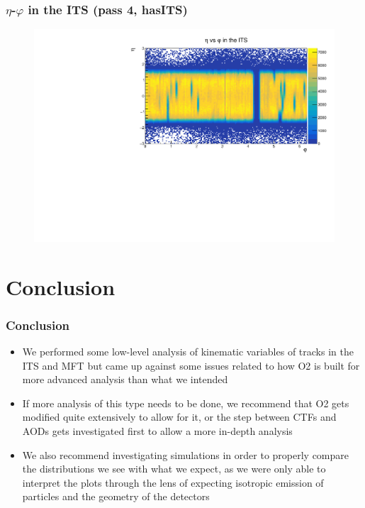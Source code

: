 \documentclass[10pt]{beamer}
\begin{document}
\begin{frame}
    \frametitle{$\eta$-$\varphi$ in the ITS (pass 4, hasITS)}
        \begin{figure}
            \begin{center}
                \includegraphics[width=\textwidth]{Plots/pass4_TracksIU/eta_phi.pdf}
            \end{center}
        \end{figure}
\end{frame}


\section{Conclusion}

\begin{frame}
    \frametitle{Conclusion}

    \begin{itemize}
        \item We performed some low-level analysis of kinematic variables of tracks in the ITS and MFT but came up against some issues related to how O2 is built for more advanced analysis than what we intended
        \item If more analysis of this type needs to be done, we recommend that O2 gets modified quite extensively to allow for it, or the step between CTFs and AODs gets investigated first to allow a more in-depth analysis
        \item We also recommend investigating simulations in order to properly compare the distributions we see with what we expect, as we were only able to interpret the plots through the lens of expecting isotropic emission of particles and the geometry of the detectors

    \end{itemize}

\end{frame}
\end{document}
